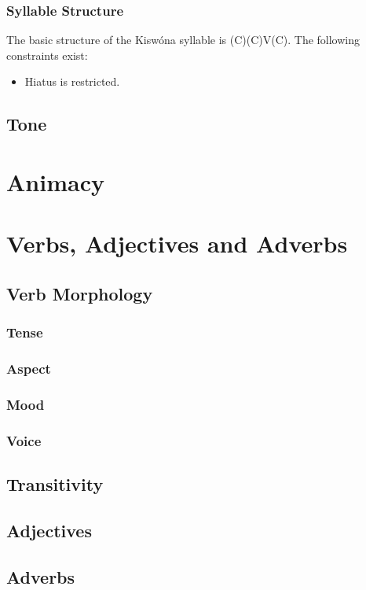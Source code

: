 \documentclass[11pt,a4paper,titlepage]{article}
\begin{document}
			\subsubsection{Syllable Structure}
				The basic structure of the Kisw\'ona syllable is (C)(C)V(C). The following constraints exist:
				\begin{itemize}
					\item{Hiatus is restricted.}
				\end{itemize}
		\subsection{Tone}
			\lipsum[1]
	\section{Animacy}
		\lipsum[1]
	\section{Verbs, Adjectives and Adverbs}
		\lipsum[1]
		\subsection{Verb Morphology}
			\lipsum[1]
			\subsubsection{Tense}
				\lipsum[1]
			\subsubsection{Aspect}
				\lipsum[1]
			\subsubsection{Mood}
				\lipsum[1]
			\subsubsection{Voice}
				\lipsum[1]
		\subsection{Transitivity}
			\lipsum[1]
		\subsection{Adjectives}
			\lipsum[1]
		\subsection{Adverbs}
			\lipsum[1]
\end{document}
